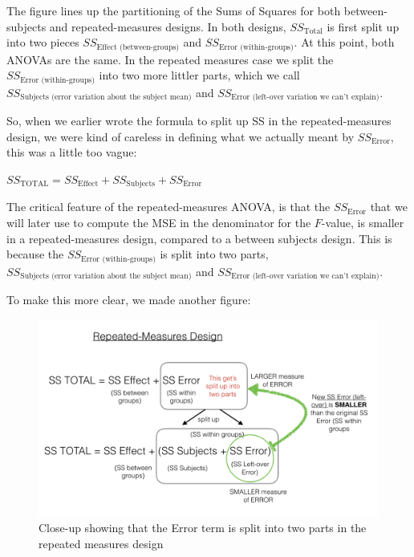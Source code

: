 \documentclass[
]{book}
\begin{document}
The figure lines up the partitioning of the Sums of Squares for both between-subjects and repeated-measures designs. In both designs, \(SS_\text{Total}\) is first split up into two pieces \(SS_\text{Effect (between-groups)}\) and \(SS_\text{Error (within-groups)}\). At this point, both ANOVAs are the same. In the repeated measures case we split the \(SS_\text{Error (within-groups)}\) into two more littler parts, which we call \(SS_\text{Subjects (error variation about the subject mean)}\) and \(SS_\text{Error (left-over variation we can't explain)}\).

So, when we earlier wrote the formula to split up SS in the repeated-measures design, we were kind of careless in defining what we actually meant by \(SS_\text{Error}\), this was a little too vague:

\(SS_\text{TOTAL} = SS_\text{Effect} + SS_\text{Subjects} +SS_\text{Error}\)

The critical feature of the repeated-measures ANOVA, is that the \(SS_\text{Error}\) that we will later use to compute the MSE in the denominator for the \(F\)-value, is smaller in a repeated-measures design, compared to a between subjects design. This is because the \(SS_\text{Error (within-groups)}\) is split into two parts, \(SS_\text{Subjects (error variation about the subject mean)}\) and \(SS_\text{Error (left-over variation we can't explain)}\).

To make this more clear, we made another figure:

\begin{figure}
\centering
\includegraphics{figures/SS_RMANOVA.png}
\caption{\label{fig:8moresplit}Close-up showing that the Error term is split into two parts in the repeated measures design}
\end{figure}
\end{document}

